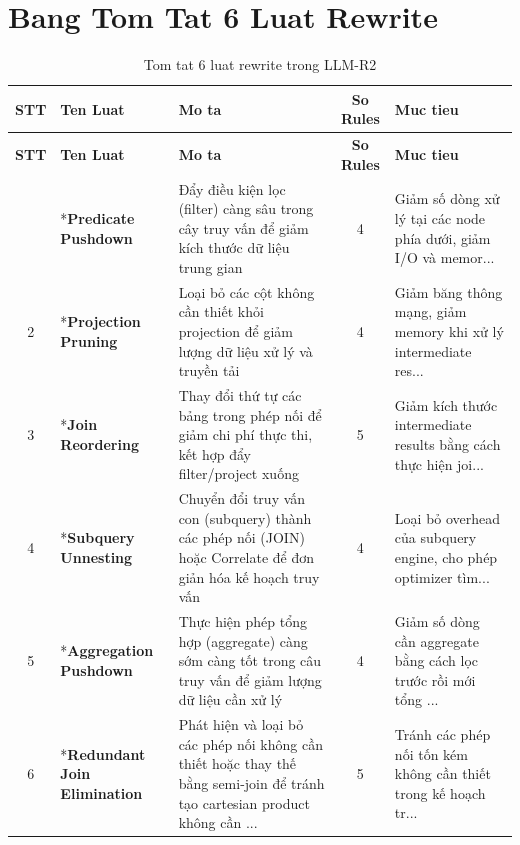 
\usepackage{booktabs}
\usepackage{longtable}
\usepackage[utf8]{inputenc}
\usepackage[vietnamese]{babel}
\usepackage{graphicx}
\usepackage{array}
\usepackage{makecell}
\usepackage{multirow}
\usepackage{geometry}
\geometry{a4paper, margin=25mm}


\section{Bang Tom Tat 6 Luat Rewrite}

\begin{longtable}{|c|p{4cm}|p{5cm}|c|p{3.5cm}|}
\caption{Tom tat 6 luat rewrite trong LLM-R2} \\
\hline
{\bf STT} & {\bf Ten Luat} & {\bf Mo ta} & {\bf So Rules} & {\bf Muc tieu} \\ \hline
\endfirsthead
\hline
{\bf STT} & {\bf Ten Luat} & {\bf Mo ta} & {\bf So Rules} & {\bf Muc tieu} \\ \hline
\endhead
\endfoot
\endlastfoot
1 & *{\bf Predicate Pushdown} & Đẩy điều kiện lọc (filter) càng sâu trong cây truy vấn để giảm kích thước dữ liệu trung gian & 4 & Giảm số dòng xử lý tại các node phía dưới, giảm I/O và memor... \\ \hline
2 & *{\bf Projection Pruning} & Loại bỏ các cột không cần thiết khỏi projection để giảm lượng dữ liệu xử lý và truyền tải & 4 & Giảm băng thông mạng, giảm memory khi xử lý intermediate res... \\ \hline
3 & *{\bf Join Reordering} & Thay đổi thứ tự các bảng trong phép nối để giảm chi phí thực thi, kết hợp đẩy filter/project xuống & 5 & Giảm kích thước intermediate results bằng cách thực hiện joi... \\ \hline
4 & *{\bf Subquery Unnesting} & Chuyển đổi truy vấn con (subquery) thành các phép nối (JOIN) hoặc Correlate để đơn giản hóa kế hoạch truy vấn & 4 & Loại bỏ overhead của subquery engine, cho phép optimizer tìm... \\ \hline
5 & *{\bf Aggregation Pushdown} & Thực hiện phép tổng hợp (aggregate) càng sớm càng tốt trong câu truy vấn để giảm lượng dữ liệu cần xử lý & 4 & Giảm số dòng cần aggregate bằng cách lọc trước rồi mới tổng ... \\ \hline
6 & *{\bf Redundant Join Elimination} & Phát hiện và loại bỏ các phép nối không cần thiết hoặc thay thế bằng semi-join để tránh tạo cartesian product không cần ... & 5 & Tránh các phép nối tốn kém không cần thiết trong kế hoạch tr... \\ \hline
\end{longtable}

